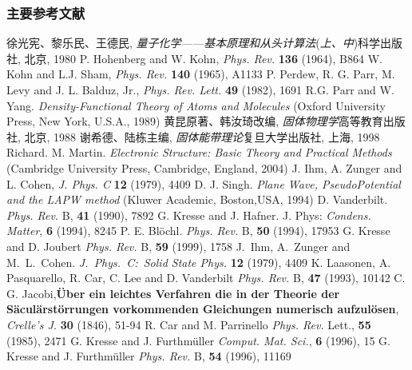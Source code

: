 {
\frametitle{主要参考文献}
\begin{thebibliography}{99}
{\tiny
{}徐光宪、黎乐民、王德民, {\textit{量子化学——基本原理和从头计算法}}\;\textrm{({\textit{上、中}})}\:科学出版社, 北京, 1980
\textrm{P. Hohenberg and W. Kohn, \textit{Phys. Rev.} \textbf{136} (1964), B864}
\textrm{W. Kohn and L.J. Sham, \textit{Phys. Rev.} \textbf{140} (1965), A1133}
\textrm{P. Perdew, R. G. Parr, M. Levy and J. L. Balduz, Jr., \textit{Phys. Rev. Lett.} \textbf{49} (1982), 1691}
\textrm{R.G. Parr and W. Yang. \textit{Density-Functional Theory of Atoms and Molecules} (Oxford University Press, New York, U.S.A., 1989)}
	黄昆\:原著、韩汝琦\:改编, {\textit{固体物理学}}\:高等教育出版社, 北京, 1988
	谢希德、陆栋\:主编, {\textit{固体能带理论}}\:复旦大学出版社, 上海, 1998
	\textrm{Richard. M. Martin. \textit{Electronic Structure: Basic Theory and Practical Methods} (Cambridge University Press, Cambridge, England, 2004)}
	\textrm{J. Ihm, A. Zunger and L. Cohen, {\textit{J. Phys. C}} \textbf{12} (1979), 4409}
        \textrm{D. J. Singh. \textit{Plane Wave, PseudoPotential and the LAPW method} (Kluwer Academic, Boston,USA, 1994)}					%
	\textrm{D. Vanderbilt. \textit{Phys. Rev.} B, \textbf{41} (1990), 7892} 
	\textrm{G. Kresse and J. Hafner. J. Phys: \textit{Condens. Matter}, \textbf{6} (1994), 8245}
	\textrm{P. E. Bl\"ochl. \textit{Phys. Rev.} B, \textbf{50} (1994), 17953}
	\textrm{G. Kresse and D. Joubert \textit{Phys. Rev.} B, \textbf{59} (1999), 1758}
\textrm{J.~Ihm, A.~Zunger and M.~L.~Cohen. \textit{J.~Phys.~C:~Solid State Phys.} \textbf{12} (1979), 4409}
\textrm{K. Laasonen, A. Pasquarello, R. Car, C. Lee and D. Vanderbilt \textit{Phys. Rev.} B, \textbf{47} (1993), 10142}
	\textrm{C. G. Jacobi,\textbf{\"Uber ein leichtes Verfahren die in der Theorie der S\"acul\"arst\"orrungen vorkommenden Gleichungen numerisch aufzul\"osen}, \textit{Crelle's J.} \textbf{30} (1846), 51-94}
	\textrm{R. Car and M. Parrinello \textit{Phys. Rev.} Lett., \textbf{55} (1985), 2471}
	\textrm{G. Kresse and J. Furthm\"uller \textit{Comput. Mat. Sci.}, \textbf{6} (1996), 15}
	\textrm{G. Kresse and J. Furthm\"uller \textit{Phys. Rev.} B, \textbf{54} (1996), 11169}
}
\end{thebibliography}}

